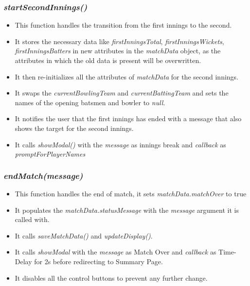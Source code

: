 \documentclass[a4paper,12pt]{article}
\begin{document}
\subsubsection{\textit{startSecondInnings()}}
\begin{itemize}
\item This function handles the transition from the first innings to the second.
\item It stores the necessary data like \textit{firstInningsTotal}, \textit{firstInningsWickets}, \textit{firstInningsBatters} in new attributes in the \textit{matchData} object, as the attributes in which the old data is present will be overwritten.
\item It then re-initializes all the attributes of \textit{matchData} for the second innings.
\item It swaps the \textit{currentBowlingTeam} and \textit{currentBattingTeam} and sets the names of the opening batsmen and bowler to \textit{null}.
\item It notifies the user that the first innings has ended with a message that also shows the target for the second innings.
\item It calls \textit{showModal()} with the \textit{message} as innings break and \textit{callback} as \textit{promptForPlayerNames} 
\end{itemize}

\subsubsection{\textit{endMatch(message)}}
\begin{itemize}
\item This function handles the end of match, it sets \textit{matchData.matchOver} to true
\item It populates the \textit{matchData.statusMessage} with the \textit{message} argument it is called with.
\item It calls \textit{saveMatchData()} and \textit{updateDisplay()}.
\item It calls \textit{showModal} with the \textit{message} as Match Over and \textit{callback} as Time-Delay for 2s before redirecting to Summary Page.
\item It disables all the control buttons to prevent any further change.
\end{itemize}
\end{document}
